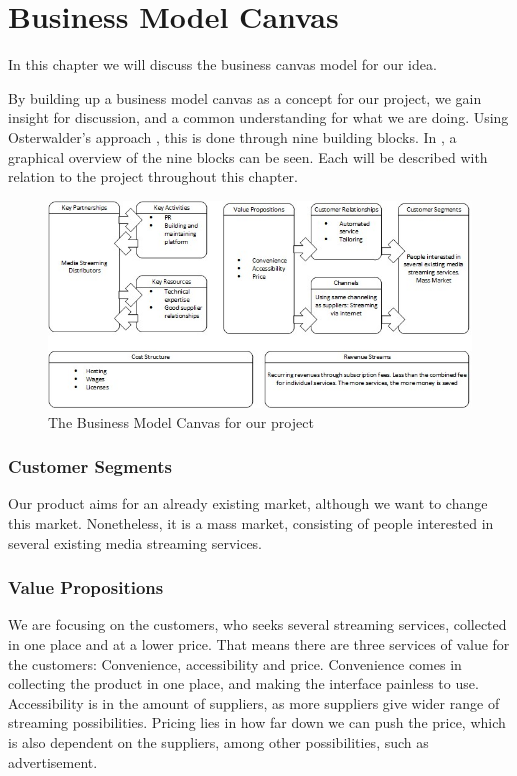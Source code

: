 \section{Business Model Canvas}
\label{sec:business_canvas}
In this chapter we will discuss the business canvas model for our idea.

By building up a business model canvas as a concept for our project, we gain insight for discussion, and a common understanding for what we are doing. Using Osterwalder's approach , this is done through nine building blocks. In , a graphical overview of the nine blocks can be seen. Each will be described with relation to the project throughout this chapter.

\begin{figure}[h]
    \begin{center}
        \includegraphics[scale=0.7]{./pics/model_canvas}
        \caption{The Business Model Canvas for our project}
        \label{fig:model_canvas}
    \end{center}
\end{figure}


\subsubsection*{Customer Segments}
Our product aims for an already existing market, although we want to change this market. Nonetheless, it is a mass market, consisting of people interested in several existing media streaming services.

\subsubsection*{Value Propositions}
We are focusing on the customers, who seeks several streaming services, collected in one place and at a lower price. That means there are three services of value for the customers: Convenience, accessibility and price. Convenience comes in collecting the product in one place, and making the interface painless to use. Accessibility is in the amount of suppliers, as more suppliers give wider range of streaming possibilities. Pricing lies in how far down we can push the price, which is also dependent on the suppliers, among other possibilities, such as advertisement.

